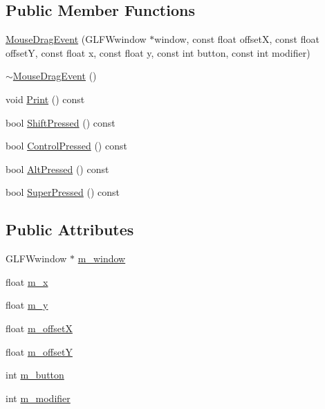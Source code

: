\subsection*{Public Member Functions}
\begin{DoxyCompactItemize}
\item 
\mbox{\hyperlink{structec_1_1_mouse_drag_event_a209ef2aaeea4f5fdda4de8f3002798a4}{Mouse\+Drag\+Event}} (G\+L\+F\+Wwindow $\ast$window, const float offsetX, const float offsetY, const float x, const float y, const int button, const int modifier)
\item 
\mbox{\hyperlink{structec_1_1_mouse_drag_event_a589e0ce60c9f229c64e64f4e7b550a80}{$\sim$\+Mouse\+Drag\+Event}} ()
\item 
void \mbox{\hyperlink{structec_1_1_mouse_drag_event_a08827eeaf27a6e24519c1848970fff74}{Print}} () const
\item 
bool \mbox{\hyperlink{structec_1_1_mouse_drag_event_a454cd7a95032be021c77def4a88b9b28}{Shift\+Pressed}} () const
\item 
bool \mbox{\hyperlink{structec_1_1_mouse_drag_event_a3d4f820f2b23c6e0e698472a98fdcdd2}{Control\+Pressed}} () const
\item 
bool \mbox{\hyperlink{structec_1_1_mouse_drag_event_a4d6ef24ef99a3328064f3a46e1e2d48e}{Alt\+Pressed}} () const
\item 
bool \mbox{\hyperlink{structec_1_1_mouse_drag_event_a6399d1f7a18e1d3a754260b5cc15e286}{Super\+Pressed}} () const
\end{DoxyCompactItemize}
\subsection*{Public Attributes}
\begin{DoxyCompactItemize}
\item 
G\+L\+F\+Wwindow $\ast$ \mbox{\hyperlink{structec_1_1_mouse_drag_event_a98e4d2a8236829d2e156eda4a09655bf}{m\+\_\+window}}
\item 
float \mbox{\hyperlink{structec_1_1_mouse_drag_event_a4ebf4f701f677620bc1f76232ca1c9a5}{m\+\_\+x}}
\item 
float \mbox{\hyperlink{structec_1_1_mouse_drag_event_ae66c5f3b087578bfcef4ff1215b50be7}{m\+\_\+y}}
\item 
float \mbox{\hyperlink{structec_1_1_mouse_drag_event_afb2e5e98e6c0014b311d1b4aec103638}{m\+\_\+offsetX}}
\item 
float \mbox{\hyperlink{structec_1_1_mouse_drag_event_a9019720292c490f1a09ecda32f89ae6e}{m\+\_\+offsetY}}
\item 
int \mbox{\hyperlink{structec_1_1_mouse_drag_event_a10244c9d449dd4343281526350e1993f}{m\+\_\+button}}
\item 
int \mbox{\hyperlink{structec_1_1_mouse_drag_event_a9434738e62de520a280e4776232ce1a1}{m\+\_\+modifier}}
\end{DoxyCompactItemize}


